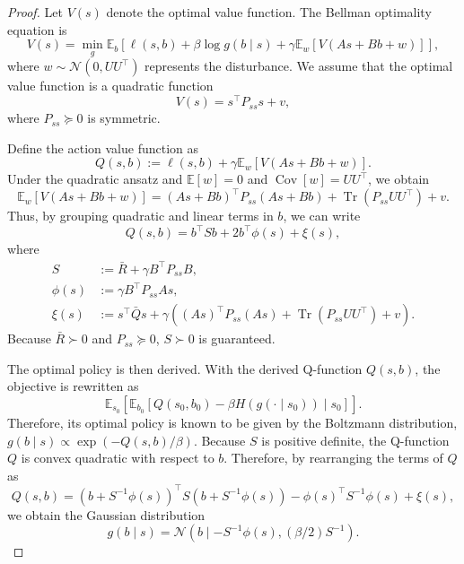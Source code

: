 \documentclass[letterpaper]{article} %
\DeclareMathOperator{\Tr}{Tr}     %
\DeclareMathOperator{\Cov}{Cov}   %
\providecommand{\E}{\mathbb{E}} %
\begin{document}
\begin{proof}
    Let $V(s)$ denote the optimal value function.
    The Bellman optimality equation is 
    \begin{equation}
    V(s) = \min_{g} \E_{b}\left[ \ell(s, b) + \beta \log g(b \mid s) + \gamma \E_{w}\left[ V(As+Bb+w)\right]\right],
    \end{equation}
    where $w \sim \mathcal{N}(0, UU^\top)$ represents the disturbance.
    We assume that the optimal value function is a quadratic function
    \begin{equation}
    V(s) = s^\top P_{ss} s + v ,
    \end{equation}
    where $P_{ss} \succcurlyeq 0$ is symmetric. 
    
    Define the action value function as
    \begin{equation}
    Q(s, b) := \ell(s, b) + \gamma \E_{w}[V(As + Bb + w)].
    \end{equation}
    Under the quadratic ansatz and $\E[w] = 0$ and $\Cov[w] = UU^\top$, we obtain
    \begin{equation}
    \E_{w}[V(As + Bb + w)] = (A s + Bb)^\top P_{ss} (A s + Bb) + \Tr(P_{ss} UU^\top) + v .
    \end{equation}
    Thus, by grouping quadratic and linear terms in $b$, we can write
    \begin{equation}
    Q(s, b) = b^\top S b + 2 b^\top \phi(s) + \xi(s),
    \end{equation}
    where
    \begin{align}
    S &:= \bar{R} + \gamma B^\top P_{ss} B,\\
    \phi(s) &:= \gamma B^\top P_{ss} A s,\\
    \xi(s) &:= s^\top \bar{Q} s + \gamma ((A s)^\top P_{ss} (A s) + \Tr(P_{ss} UU^\top) + v).
    \end{align}
    Because $\bar{R} \succ 0$ and $P_{ss} \succcurlyeq 0$, $S \succ 0$ is guaranteed.
    
    The optimal policy is then derived. With the derived Q-function $Q(s, b)$, the objective is rewritten as
    \begin{equation}
    \E_{s_0}\left[  \E_{b_0} \left[ Q(s_0, b_0) - \beta H(g(\cdot \mid s_0)) \mid s_0\right] \right].
    \end{equation}
    Therefore, its optimal policy is known to be given by the Boltzmann distribution, $g(b \mid s) \propto \exp( - Q(s, b) / \beta)$. Because $S$ is positive definite, the Q-function $Q$ is convex quadratic with respect to $b$. Therefore, by rearranging the terms of $Q$ as
    \begin{equation}
    Q(s, b) = (b + S^{-1} \phi(s))^\top S (b + S^{-1} \phi(s)) - \phi(s)^\top S^{-1} \phi(s) + \xi(s),
    \end{equation}
    we obtain the Gaussian distribution
    \begin{equation}
    g(b \mid s) = \mathcal{N}(b \mid - S^{-1} \phi(s), (\beta / 2) S^{-1}).
    \end{equation}
    

\end{proof}
\end{document}
